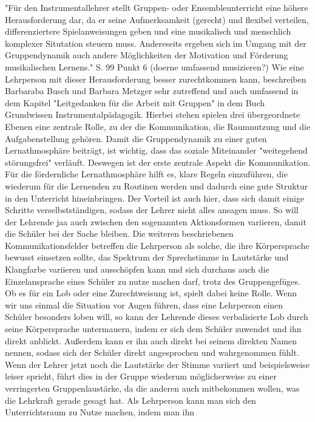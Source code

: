 "Für den Instrumentallehrer stellt Gruppen- oder Ensembleunterricht eine höhere
Herausforderung dar, da er seine Aufmerksamkeit (gerecht) und flexibel
verteilen, differenziertere Spielanweisungen geben und eine musikalisch und
menschlich komplexer Situtation steuern muss. Andereseits ergeben sich im Umgang
mit der Gruppendynamik auch andere Möglichkeiten der Motivation und Förderung
musikalischen Lernens." S. 99 Punkt 6 (doerne umfassend musizieren?)
Wie eine Lehrperson mit dieser Herausforderung besser zurechtkommen kann,
beschreiben Barbaraba Busch und Barbara Metzger sehr zutreffend und auch
umfassend in dem Kapitel "Leitgedanken für die Arbeit mit Gruppen" in dem Buch
Grundwissen Instrumentalpädagogik. Hierbei stehen spielen drei übergeordnete
Ebenen eine zentrale Rolle, zu der die Kommunikation, die Raumnutzung und die
Aufgabenstellung gehören. 
Damit die Gruppendynamik zu einer guten Lernathmosphäre beiträgt, ist wichtig,
dass das soziale Miteinander "weitegehend störungsfrei" verläuft. Deswegen ist
der erste zentrale Aspekt die Kommunikation. Für die fördernliche
Lernathmosphäre hilft es, klare Regeln einzuführen, die wiederum für die
Lernenden zu Routinen werden und dadurch eine gute Struktur in den Unterricht
hineinbringen. Der Vorteil ist auch hier, dass sich damit einige Schritte
verselbstständigen, sodass der Lehrer nicht alles ansagen muss. So will der
Lehrende jaa auch zwischen den sogenannten Aktionsformen variieren, damit die
Schüler bei der Sache bleiben. Die weiteren beschriebenen Kommunikationsfelder
betreffen die Lehrperson als solche, die ihre Körpersprache bewusst einsetzen
sollte, das Spektrum der Sprechstimme in Lautstärke und Klangfarbe variieren und
ausschöpfen kann und sich durchaus auch die Einzelansprache eines Schüler zu
nutze machen darf, trotz des Gruppengefüges. Ob es für ein Lob oder eine
Zurechtweisung ist, spielt dabei keine Rolle. Wenn wir uns einmal die Situation
vor Augen führen, dass eine Lehrperson einen Schüler besonders loben will, so
kann der Lehrende dieses verbalisierte Lob durch seine Körpersprache
untermauern, indem er sich dem Schüler zuwendet und ihn direkt anblickt.
Außerdem kann er ihn auch direkt bei seinem direkten Namen nennen, sodass sich
der Schüler direkt angesprochen und wahrgenommen fühlt. Wenn der Lehrer jetzt
noch die Lautstärke der Stimme variiert und beispielsweise leiser spricht, führt
dies in der Gruppe wiederum möglicherweise zu einer verringerten
Gruppenlaustärke, da die anderen auch mitbekommen wollen, was die Lehrkraft
gerade gesagt hat. 
Als Lehrperson kann man sich den Unterrichtsraum zu Nutze machen, indem man ihn
